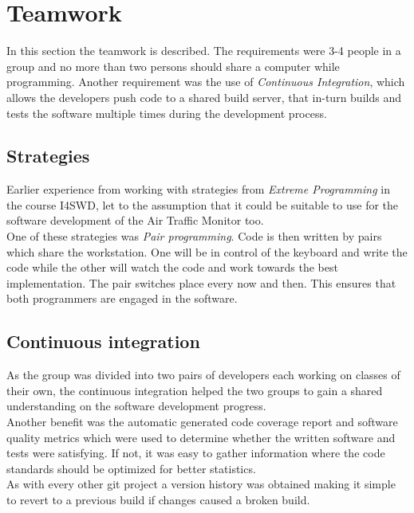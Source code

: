 \section{Teamwork}
In this section the teamwork is described. The requirements were 3-4 people in a group and no more than two persons should share a computer while programming. Another requirement was the use of \emph{Continuous Integration}, which allows the developers push code to a shared build server, that in-turn builds and tests the software multiple times during the development process.

\subsection{Strategies}
Earlier experience from working with strategies from \emph{Extreme Programming} in the course I4SWD, let to the assumption that it could be suitable to use for the software development of the Air Traffic Monitor too. \\
One of these strategies was \emph{Pair programming}. Code is then written by pairs which share the workstation. One will be in control of the keyboard and write the code while the other will watch the code and work towards the best implementation. The pair switches place every now and then. This ensures that both programmers are engaged in the software.

\subsection{Continuous integration}
As the group was divided into two pairs of developers each working on classes of their own, the continuous integration helped the two groups to gain a shared understanding on the software development progress.\\ 
Another benefit was the automatic generated code coverage report and software quality metrics which were used to determine whether the written software and tests were satisfying. If not, it was easy to gather information where the code standards should be optimized for better statistics.\\ 
As with every other git project a version history was obtained making it simple to revert to a previous build if changes caused a broken build.\\